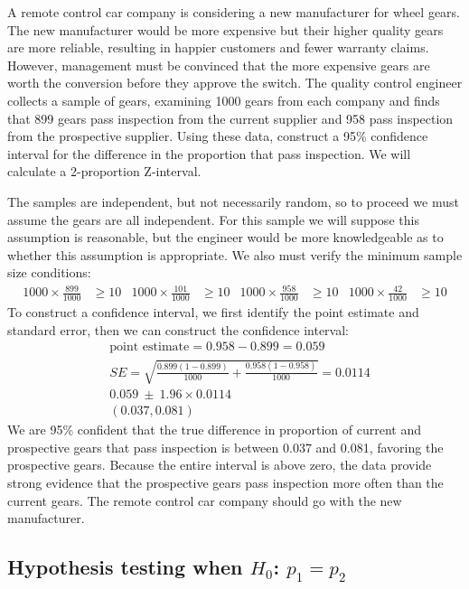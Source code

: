 \begin{example}{A remote control car company is considering a new manufacturer for wheel gears. The new manufacturer would be more expensive but their higher quality gears are more reliable, resulting in happier customers and fewer warranty claims. However, management must be convinced that the more expensive gears are worth the conversion before they approve the switch. The quality control engineer collects a sample of gears, examining 1000 gears from each company and finds that 899 gears pass inspection from the current supplier and 958 pass inspection from the prospective supplier. Using these data, construct a 95\% confidence interval for the difference in the proportion that pass inspection.}
We will calculate a 2-proportion Z-interval.

The samples are independent, but not necessarily random, so to proceed we must assume the gears are all independent. For this sample we will suppose this assumption is reasonable, but the engineer would be more knowledgeable as to whether this assumption is appropriate. We also must verify the minimum sample size conditions:
\begin{align*}
1000 \times \frac{899}{1000} &\ge 10
	&1000 \times \frac{101}{1000} &\ge 10
	&1000 \times \frac{958}{1000} &\ge 10
	&1000 \times \frac{42}{1000} &\ge 10
\end{align*}
To construct a confidence interval, we first identify the point estimate and standard error, then we can construct the confidence interval:
\begin{align*}
&\text{point estimate} = 0.958 - 0.899 = 0.059 \\
&SE = \sqrt{\frac{0.899(1-0.899)}{1000} +
			\frac{0.958(1-0.958)}{1000}}
	= 0.0114 \\
&0.059\ \pm\ 1.96 \times 0.0114 \\
&(0.037, 0.081)
\end{align*}
We are 95\% confident that the true difference in proportion of current and prospective gears that pass inspection is between 0.037 and 0.081, favoring the prospective gears. Because the entire interval is above zero, the data provide strong evidence that the prospective gears pass inspection more often than the current gears. The remote control car company should go with the new manufacturer.
\end{example}


\textA{\newpage}

\subsection{Hypothesis testing when $H_0$: $p_1 = p_2$}
\label{pooledHTForProportionsSection}

